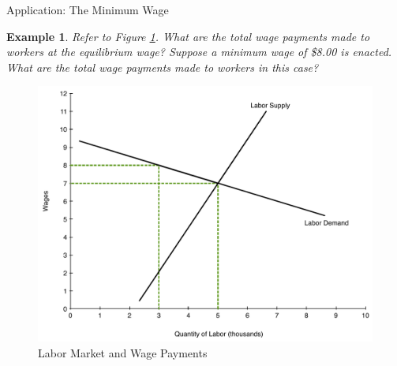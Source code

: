 \documentclass[xcolor={dvipsnames},pdf, hyperref={colorlinks=true, citecolor=ForestGreen, linkcolor=BlueViolet, urlcolor=Magenta}]{beamer}
\newtheorem{exmp}{Example}[section]
\newcommand{\ddp}[1]{{\textcolor{ForestGreen}{#1}}}
\begin{document}
\begin{frame}{Application: The Minimum Wage}
	
	\begin{exmp} 
		\scriptsize
		Refer to Figure \ref{fig3}. What are the total wage payments made to workers at the equilibrium wage? Suppose a minimum wage of \$8.00 is enacted. What are the total wage payments made to workers in this case?
	\end{exmp}
	\begin{figure}[H]
	\centering
	\includegraphics[scale=.24]{notes05_plot1.pdf}
	\caption{Labor Market and Wage Payments}
	\label{fig3}
\end{figure}
	\scriptsize
\pause	\ddp{At eq. wage: $7\times 5,000 = \$35,000$ \\
	At min wage: $8\times 3,000 = \$24,000$.}
\end{frame}
\end{document}
